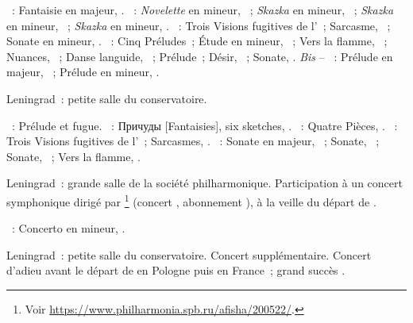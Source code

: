 \begin{description}
 \textsc{\Schumann{}}~: Fantaisie en \kC majeur, .
 \textsc{\Medtner{}}~: \emph{Novelette} en \kC mineur, 
 ~; \emph{Skazka} en \kE mineur,  ~;
 \emph{Skazka} en \kF mineur,  ~; \emph{Skazka} en \kB
 mineur,  .
 \textsc{\Prokofiev{}}~: Trois Visions fugitives de l'~; Sarcasme,
  ~; Sonate en \kA mineur, .
 \textsc{\Scriabine{}}~: Cinq Préludes~; Étude en \kD \Sharp mineur,
  ~; Vers la flamme, ~; Nuances, 
 ~; Danse languide,  ~; Prélude~; Désir,
  ~; Sonate, .
 \emph{Bis} -- \textsc{\Rachmaninov{}}~: Prélude en \kG majeur, 
 ~; Prélude en \kG \Sharp mineur,  .
 \item[\DateWithWeekDay{1928-02-26}]
 Leningrad~: petite salle du conservatoire.

 \textsc{\Glazounov{}}~: Prélude et fugue.
 \textsc{\Miaskovski{}}~: \foreignlanguage{russian}{Причуды} [Fantaisies],
 six sketches, .
 \textsc{\Liadov{}}~: Quatre Pièces, .
 \textsc{\Prokofiev{}}~: Trois Visions fugitives de l'~; Sarcasmes,
 .
 \textsc{\Scriabine{}}~: Sonate en \kF \Sharp majeur, ~; Sonate,
 ~; Sonate, ~; Vers la flamme, .
 \item[\DateWithWeekDay{1928-03-04}]
 Leningrad~: grande salle de la société philharmonique.
 Participation à un concert symphonique dirigé par \AGauk{}%
 \footnote{Voir \href{https://www.philharmonia.spb.ru/afisha/200522/}%
 {https://www.philharmonia.spb.ru/afisha/200522/}.}
 (concert , abonnement ), à la veille du départ de
 \Glazounov{}.

 \textsc{\Glazounov{}}~: Concerto en \kF mineur, .
 \item[\DateWithWeekDay{1928-03-06}]
 Leningrad~: petite salle du conservatoire.
 Concert supplémentaire.
 Concert d'adieu avant le départ de \VSofronitsky{} en Pologne puis en
 France~; grand succès \citep[voir][p.~148]{Nekrasova08}.


\end{description}
